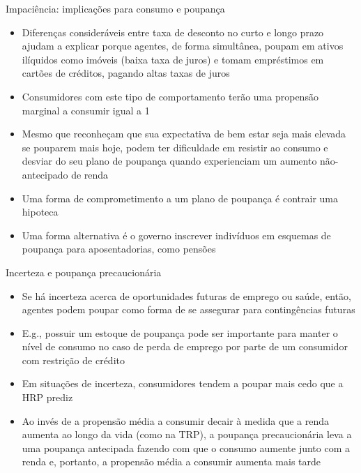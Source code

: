 \documentclass[10pt]{beamer}
\begin{document}
\begin{frame}
    {Impaciência: implicações para consumo e poupança}
    \begin{itemize}
        \item Diferenças consideráveis entre taxa de desconto no curto e longo prazo ajudam a explicar porque agentes, de forma simultânea, poupam em ativos ilíquidos como imóveis (baixa taxa de juros) e tomam empréstimos em cartões de créditos, pagando altas taxas de juros\bigskip
        \item Consumidores com este tipo de comportamento terão uma propensão marginal a consumir igual a 1\bigskip
        \item Mesmo que reconheçam que sua expectativa de bem estar seja mais elevada se pouparem mais hoje, podem ter dificuldade em resistir ao consumo e desviar do seu plano de poupança quando experienciam um aumento não-antecipado de renda\bigskip
        \item Uma forma de comprometimento a um plano de poupança é contrair uma hipoteca\bigskip
        \item Uma forma alternativa é o governo inscrever indivíduos em esquemas de poupança para aposentadorias, como pensões
    \end{itemize}
\end{frame}

\begin{frame}
    {Incerteza e poupança precaucionária}
    \begin{itemize}
        \item Se há incerteza acerca de oportunidades futuras de emprego ou saúde, então, agentes podem poupar como forma de se assegurar para contingências futuras\bigskip
        \item E.g., possuir um estoque de poupança pode ser importante para manter o nível de consumo no caso de perda de emprego por parte de um consumidor com restrição de crédito\bigskip
        \item Em situações de incerteza, consumidores tendem a poupar mais cedo que a HRP prediz\bigskip
        \item Ao invés de a propensão média a consumir decair à medida que a renda aumenta ao longo da vida (como na TRP), a poupança precaucionária leva a uma poupança antecipada fazendo com que o consumo aumente junto com a renda e, portanto, a propensão média a consumir aumenta mais tarde
    \end{itemize}
\end{frame}
\end{document}
